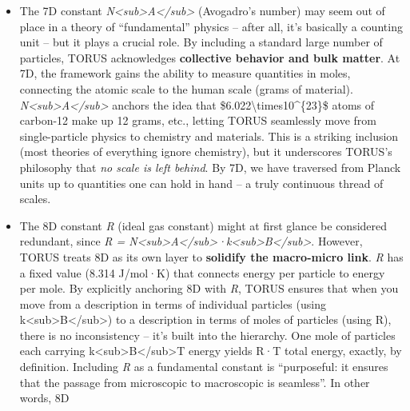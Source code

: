 \documentclass[]{article}
\begin{document}
{{\begin{itemize}
  of freedom to talk about statistical ensembles and entropy. In TORUS,
  6D marks where a single particle's energy (set by 5D \emph{h} and some
  frequency) can be interpreted as thermal energy
  *k\textless{}sub\textgreater{}B\textless{}/sub\textgreater{}T in an
  ensemble. Thus,
  \emph{k\textless{}sub\textgreater{}B\textless{}/sub\textgreater{}}
  anchors the concept of temperature in the unified framework.
\item
  The 7D constant
  \emph{N\textless{}sub\textgreater{}A\textless{}/sub\textgreater{}}
  (Avogadro's number) may seem out of place in a theory of
  ``fundamental'' physics -- after all, it's basically a counting unit
  -- but it plays a crucial role. By including a standard large number
  of particles, TORUS acknowledges \textbf{collective behavior and bulk
  matter}. At 7D, the framework gains the ability to measure quantities
  in moles, connecting the atomic scale to the human scale (grams of
  material).
  \emph{N\textless{}sub\textgreater{}A\textless{}/sub\textgreater{}}
  anchors the idea that \$6.022\textbackslash{}times10\^{}\{23\}\$ atoms
  of carbon-12 make up 12 grams, etc., letting TORUS seamlessly move
  from single-particle physics to chemistry and materials. This is a
  striking inclusion (most theories of everything ignore chemistry), but
  it underscores TORUS's philosophy that \emph{no scale is left behind}.
  By 7D, we have traversed from Planck units up to quantities one can
  hold in hand -- a truly continuous thread of scales​.
\item
  The 8D constant \emph{R} (ideal gas constant) might at first glance be
  considered redundant, since \emph{R =
  N\textless{}sub\textgreater{}A\textless{}/sub\textgreater{}·k\textless{}sub\textgreater{}B\textless{}/sub\textgreater{}}.
  However, TORUS treats 8D as its own layer to \textbf{solidify the
  macro-micro link}. \emph{R} has a fixed value (8.314 J/mol·K) that
  connects energy per particle to energy per mole. By explicitly
  anchoring 8D with \emph{R}, TORUS ensures that when you move from a
  description in terms of individual particles (using
  k\textless{}sub\textgreater{}B\textless{}/sub\textgreater{}) to a
  description in terms of moles of particles (using R), there is no
  inconsistency -- it's built into the hierarchy. One mole of particles
  each carrying
  k\textless{}sub\textgreater{}B\textless{}/sub\textgreater{}T energy
  yields R·T total energy, exactly, by definition. Including \emph{R} as
  a fundamental constant is ``purposeful: it ensures that the passage
  from microscopic to macroscopic is seamless''​. In other words, 8D

\end{itemize}}}
\end{document}
